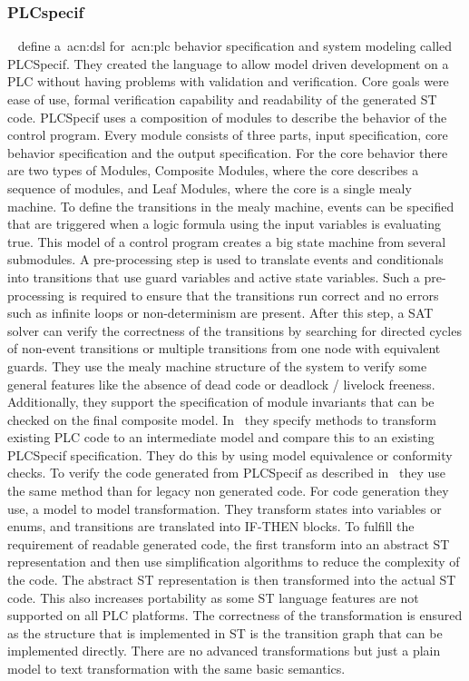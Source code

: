 \subsubsection{PLCspecif}
\label{sec:sub:plfspecif}

\citeauthor{7819191}~\cite{7819191, darvas2015syntax, darvas2015requirements, darvas2015formal, 10.1007/978-3-319-33693-0_32} define a~\acrshort{acn:dsl} for~\acrshort{acn:plc} behavior specification and system modeling called PLCSpecif.
They created the language to allow model driven development on a PLC without having problems with validation and verification.
Core goals were ease of use, formal verification capability and readability of the generated ST code.
PLCSpecif uses a composition of modules to describe the behavior of the control program.
Every module consists of three parts, input specification, core behavior specification and the output specification.
For the core behavior there are two types of Modules, Composite Modules, where the core describes a sequence of modules, and Leaf Modules, where the core is a single mealy machine.
To define the transitions in the mealy machine, events can be specified that are triggered when a logic formula using the input variables is evaluating true.
This model of a control program creates a big state machine from several submodules.
A pre-processing step is used to translate events and conditionals into transitions that use guard variables and active state variables.
Such a pre-processing is required to ensure that the transitions run correct and no errors such as infinite loops or non-determinism are present.
After this step, a SAT solver can verify the correctness of the  transitions by searching for directed cycles of non-event transitions or multiple transitions from one node with equivalent guards.
They use the mealy machine structure of the system to verify some general features like the absence of dead code or deadlock / livelock freeness.
Additionally, they support the specification of module invariants that can be checked on the final composite model.
In~\cite{10.1007/978-3-319-33693-0_32} they specify methods to transform existing PLC code to an intermediate model and compare this to an existing PLCSpecif specification.
They do this by using model equivalence or conformity checks.
To verify the code generated from PLCSpecif as described in~\cite{7819191} they use the same method than for legacy non generated code.
For code generation they use, a model to model transformation.
They transform states into variables or enums, and transitions are translated into IF-THEN blocks.
To fulfill the requirement of readable generated code, the first transform into an abstract ST representation and then use simplification algorithms to reduce the complexity of the code.
The abstract ST representation is then transformed into the actual ST code.
This also increases portability as some ST language features are not supported on all PLC platforms.
The correctness of the transformation is ensured as the structure that is implemented in ST is the transition graph that can be implemented directly.
There are no advanced transformations but just a plain model to text transformation with the same basic semantics.
